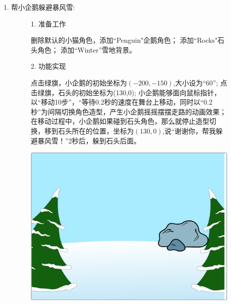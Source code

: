 \documentclass[10pt, a4paper]{article}
\begin{document}
\begin{enumerate}
        \item 帮小企鹅躲避暴风雪:
        \begin{figure}[htbp]
            \begin{minipage}{.6\textwidth}
                1. 准备工作
                \begin{tasks}[label = (\arabic*)]
                    \task 删除默认的小猫角色，添加“Penguin"企鹅角色；
                    \task 添加“Rocks"石头角色；
                    \task 添加“Winter”雪地背景。
                \end{tasks}
                2. 功能实现
                \begin{tasks}[label = (\arabic*)]
                    \task 点击绿旗，小企鹅的初始坐标为$(-200,-150)$,大小设为“60”;
                    \task 点击绿旗，石头的初始坐标为(130,0);
                    \task 小企鹅能够面向鼠标指针，以“移动10步”，“等待0.2秒的速度在舞台上移动，同时以“0.2秒”为间隔切换角色造型，产生小企鹅摇摇摆摆走路的动画效果；
                    \task 在移动过程中，小企鹅如果碰到石头角色，那么就停止造型切换，移到石头所在的位置，坐标为$(130,0)$,说“谢谢你，帮我躲避暴风雪！”2秒后，躲到石头后面。
                \end{tasks}
            \end{minipage}
            \begin{minipage}{.37\textwidth}
                \centering
                \includegraphics[width=.8\textwidth]{37.png}
            \end{minipage}
        \end{figure}
    \end{enumerate}
\end{document}
